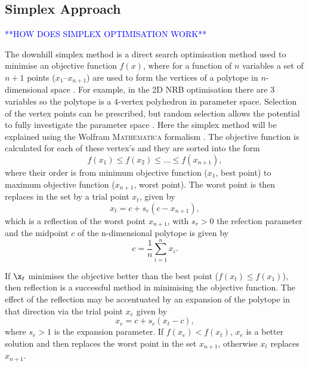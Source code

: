 \documentclass[../main.tex]{subfiles}
\begin{document}
\subsection{Simplex Approach}

\textcolor{blue}{**HOW DOES SIMPLEX OPTIMISATION WORK**}

The downhill simplex method is a direct search optimisation method used to minimise an objective function $f\left(x\right)$, where for a function of $n$ variables a set of $n+1$ points ($x_{1}$--$x_{n+1}$) are used to form the vertices of a polytope in $n$-dimensional space \cite{wolfram2021nmaximize}. For example, in the 2D NRB optimisation there are 3 variables so the polytope is a 4-vertex polyhedron in parameter space. Selection of
the vertex points can be prescribed, but random selection allows the potential to fully investigate the parameter space \cite{koshel2002enhancement}. Here the simplex method will be explained using the Wolfram \textsc{Mathematica} formalism \cite{wolfram2021nmaximize}. The objective function is calculated for each of these vertex's and they are sorted into the form
\begin{equation}
f\left(x_{1}\right) \leq f\left(x_{2}\right) \leq \ldots \leq f\left(x_{n+1}\right),
\label{eq:simplex_polytope_objective_functions}
\end{equation}
where their order is from minimum objective function ($x_{1}$, best point) to maximum objective function ($x_{n+1}$, worst point). The worst point is then replaces in the set by a trial point $x_{t}$, given by
\begin{equation}
x_{t} = c+s_{r}\left(c-x_{n+1}\right),
\label{eq:simplex_trial_point}    
\end{equation}
which is a reflection of the worst point $x_{n+1}$, with $s_{r} > 0$ the refection parameter and the midpoint $c$ of the n-dimensional polytope is given by
\begin{equation}
c = \frac{1}{n}\sum_{i=1}^{n}x_{i}.
\label{eq:polytope_centroid_simplex}
\end{equation}

If $\x_{t}$ minimises the objective better than the best point ($f\left(x_{t}\right) \leq f\left(x_{1}\right)$), then reflection is a successful method in minimising the objective function. The effect of the reflection may be accentuated by an expansion of the polytope in that direction via the trial point $x_{e}$ given by
\begin{equation}
x_{e} = c+s_{e}\left(x_{t}-c\right),
\label{eq:simplex_expansion}    
\end{equation}
where $s_{e} > 1$ is the expansion parameter. If $f\left(x_{e}\right) < f\left(x_{t}\right)$, $x_{e}$ is a better solution and then replaces the worst point in the set $x_{n+1}$, otherwise $x_{t}$ replaces $x_{n+1}$. 
\end{document}
